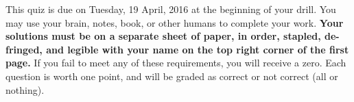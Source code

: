 \documentclass[12pt]{article}
\title{%
	}
\author{}
\date{}
\begin{document}
\maketitle

\vspace{-7pc}
 This quiz is due on Tuesday, 19 April, 2016 at the beginning of your drill.  You may use your brain, notes, book, or other humans to complete your work.  \textbf{Your solutions must be on a separate sheet of paper, in order, stapled, de-fringed, and legible with your name on the top right corner of the first page.}  If you fail to meet any of these requirements, you will receive a zero.  Each question is worth one point, and will be graded as correct or not correct (all or nothing).

\noindent\hrulefill
\end{document}
